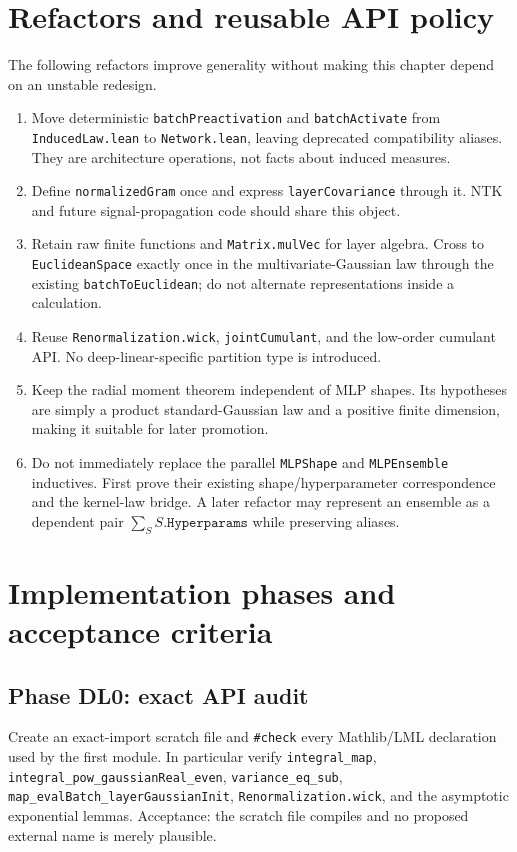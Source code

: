 \section{Refactors and reusable API policy}

The following refactors improve generality without making this chapter depend on an unstable
redesign.
\begin{enumerate}
  \item Move deterministic \texttt{batchPreactivation} and \texttt{batchActivate} from
    \texttt{InducedLaw.lean} to \texttt{Network.lean}, leaving deprecated compatibility aliases.
    They are architecture operations, not facts about induced measures.
  \item Define \texttt{normalizedGram} once and express \texttt{layerCovariance} through it.  NTK
    and future signal-propagation code should share this object.
  \item Retain raw finite functions and \texttt{Matrix.mulVec} for layer algebra.  Cross to
    \texttt{EuclideanSpace} exactly once in the multivariate-Gaussian law through the existing
    \texttt{batchToEuclidean}; do not alternate representations inside a calculation.
  \item Reuse \texttt{Renormalization.wick}, \texttt{jointCumulant}, and the low-order cumulant API.
    No deep-linear-specific partition type is introduced.
  \item Keep the radial moment theorem independent of MLP shapes.  Its hypotheses are simply a
    product standard-Gaussian law and a positive finite dimension, making it suitable for later
    promotion.
  \item Do not immediately replace the parallel \texttt{MLPShape} and \texttt{MLPEnsemble}
    inductives.  First prove their existing shape/hyperparameter correspondence and the kernel-law
    bridge.  A later refactor may represent an ensemble as a dependent pair
    $\sum_S S.\texttt{Hyperparams}$ while preserving aliases.
\end{enumerate}

\section{Implementation phases and acceptance criteria}

\subsection*{Phase DL0: exact API audit}
Create an exact-import scratch file and \texttt{\#check} every Mathlib/LML declaration used by the
first module.  In particular verify \texttt{integral\_map},
\texttt{integral\_pow\_gaussianReal\_even}, \texttt{variance\_eq\_sub},
\texttt{map\_evalBatch\_layerGaussianInit}, \texttt{Renormalization.wick}, and the asymptotic
exponential lemmas.  Acceptance: the scratch file compiles and no proposed external name is merely
plausible.

